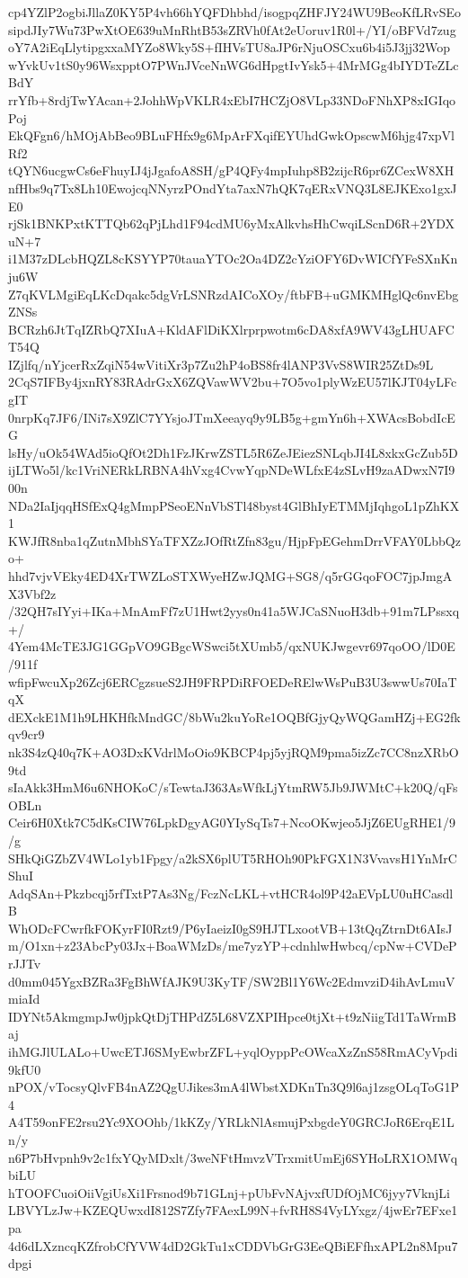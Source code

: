 cp4YZlP2ogbiJllaZ0KY5P4vh66hYQFDhbhd/isogpqZHFJY24WU9BeoKfLRvSEo
sipdJIy7Wu73PwXtOE639uMnRhtB53sZRVh0fAt2eUoruv1R0l+/YI/oBFVd7zug
oY7A2iEqLlytipgxxaMYZo8Wky5S+fIHVsTU8aJP6rNjuOSCxu6b4i5J3jj32Wop
wYvkUv1tS0y96WsxpptO7PWnJVceNnWG6dHpgtIvYsk5+4MrMGg4bIYDTeZLcBdY
rrYfb+8rdjTwYAcan+2JohhWpVKLR4xEbI7HCZjO8VLp33NDoFNhXP8xIGIqoPoj
EkQFgn6/hMOjAbBeo9BLuFHfx9g6MpArFXqifEYUhdGwkOpscwM6hjg47xpVlRf2
tQYN6ucgwCs6eFhuyIJ4jJgafoA8SH/gP4QFy4mpIuhp8B2zijcR6pr6ZCexW8XH
nfHbs9q7Tx8Lh10EwojcqNNyrzPOndYta7axN7hQK7qERxVNQ3L8EJKExo1gxJE0
rjSk1BNKPxtKTTQb62qPjLhd1F94cdMU6yMxAlkvhsHhCwqiLScnD6R+2YDXuN+7
i1M37zDLcbHQZL8cKSYYP70tauaYTOc2Oa4DZ2cYziOFY6DvWICfYFeSXnKnju6W
Z7qKVLMgiEqLKcDqakc5dgVrLSNRzdAICoXOy/ftbFB+uGMKMHglQc6nvEbgZNSs
BCRzh6JtTqIZRbQ7XIuA+KldAFlDiKXlrprpwotm6cDA8xfA9WV43gLHUAFCT54Q
IZjlfq/nYjcerRxZqiN54wVitiXr3p7Zu2hP4oBS8fr4lANP3VvS8WIR25ZtDs9L
2CqS7IFBy4jxnRY83RAdrGxX6ZQVawWV2bu+7O5vo1plyWzEU57lKJT04yLFcgIT
0nrpKq7JF6/INi7sX9ZlC7YYsjoJTmXeeayq9y9LB5g+gmYn6h+XWAcsBobdIcEG
lsHy/uOk54WAd5ioQfOt2Dh1FzJKrwZSTL5R6ZeJEiezSNLqbJI4L8xkxGcZub5D
ijLTWo5l/kc1VriNERkLRBNA4hVxg4CvwYqpNDeWLfxE4zSLvH9zaADwxN7I900n
NDa2IaIjqqHSfExQ4gMmpPSeoENnVbSTl48byst4GlBhIyETMMjIqhgoL1pZhKX1
KWJfR8nba1qZutnMbhSYaTFXZzJOfRtZfn83gu/HjpFpEGehmDrrVFAY0LbbQzo+
hhd7vjvVEky4ED4XrTWZLoSTXWyeHZwJQMG+SG8/q5rGGqoFOC7jpJmgAX3Vbf2z
/32QH7sIYyi+IKa+MnAmFf7zU1Hwt2yys0n41a5WJCaSNuoH3db+91m7LPssxq+/
4Yem4McTE3JG1GGpVO9GBgcWSwci5tXUmb5/qxNUKJwgevr697qoOO/lD0E/911f
wfipFwcuXp26Zcj6ERCgzsueS2JH9FRPDiRFOEDeRElwWsPuB3U3swwUs70IaTqX
dEXckE1M1h9LHKHfkMndGC/8bWu2kuYoRe1OQBfGjyQyWQGamHZj+EG2fkqv9cr9
nk3S4zQ40q7K+AO3DxKVdrlMoOio9KBCP4pj5yjRQM9pma5izZc7CC8nzXRbO9td
sIaAkk3HmM6u6NHOKoC/sTewtaJ363AsWfkLjYtmRW5Jb9JWMtC+k20Q/qFsOBLn
Ceir6H0Xtk7C5dKsCIW76LpkDgyAG0YIySqTs7+NcoOKwjeo5JjZ6EUgRHE1/9/g
SHkQiGZbZV4WLo1yb1Fpgy/a2kSX6plUT5RHOh90PkFGX1N3VvavsH1YnMrCShuI
AdqSAn+Pkzbcqj5rfTxtP7As3Ng/FczNcLKL+vtHCR4ol9P42aEVpLU0uHCasdlB
WhODcFCwrfkFOKyrFI0Rzt9/P6yIaeizI0gS9HJTLxootVB+13tQqZtrnDt6AIsJ
m/O1xn+z23AbcPy03Jx+BoaWMzDs/me7yzYP+cdnhlwHwbcq/cpNw+CVDePrJJTv
d0mm045YgxBZRa3FgBhWfAJK9U3KyTF/SW2Bl1Y6Wc2EdmvziD4ihAvLmuVmiaId
IDYNt5AkmgmpJw0jpkQtDjTHPdZ5L68VZXPIHpce0tjXt+t9zNiigTd1TaWrmBaj
ihMGJlULALo+UwcETJ6SMyEwbrZFL+yqlOyppPcOWcaXzZnS58RmACyVpdi9kfU0
nPOX/vTocsyQlvFB4nAZ2QgUJikes3mA4lWbstXDKnTn3Q9l6aj1zsgOLqToG1P4
A4T59onFE2rsu2Yc9XOOhb/1kKZy/YRLkNlAsmujPxbgdeY0GRCJoR6ErqE1Ln/y
n6P7bHvpnh9v2c1fxYQyMDxlt/3weNFtHmvzVTrxmitUmEj6SYHoLRX1OMWqbiLU
hTOOFCuoiOiiVgiUsXi1Frsnod9b71GLnj+pUbFvNAjvxfUDfOjMC6jyy7VknjLi
LBVYLzJw+KZEQUwxdI812S7Zfy7FAexL99N+fvRH8S4VyLYxgz/4jwEr7EFxe1pa
4d6dLXzncqKZfrobCfYVW4dD2GkTu1xCDDVbGrG3EeQBiEFfhxAPL2n8Mpu7dpgi
